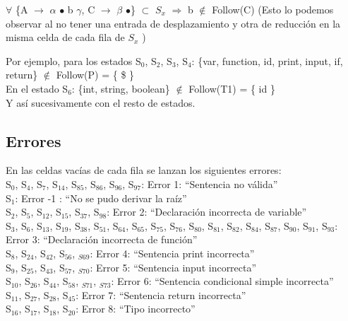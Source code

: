 	$\forall$ \{A $\rightarrow$ $\alpha$ $\bullet$ b $\gamma$, C $\rightarrow$ $\beta$ $\bullet$\} $\subset$ $S_x$ $\Rightarrow$ b $\notin$ Follow(C) (Esto lo podemos observar al no tener una entrada de desplazamiento y otra de reducción en la misma celda de cada fila de $S_x$ )

	Por ejemplo, para los estados S$_0$,  S$_2$,  S$_3$,  S$_4$: \{var, function, id, print, input, if, return\} $\notin$ Follow(P) = \{ \$ \} \\
	En el estado S$_6$:  \{int, string, boolean\} $\notin$ Follow(T1) = \{ id \}\\
	Y así sucesivamente con el resto de estados.
	
\subsection{Errores}
En las celdas vacías de cada fila se lanzan los siguientes errores:\\

S$_0$, S$_4$, S$_7$, S$_{14}$, S$_{85}$, S$_{86}$, S$_{96}$, S$_{97}$: Error 1: “Sentencia no válida” \\

S$_{1}$: Error -1 : “No se pudo derivar la raíz”\\

S$_{2}$, S$_{5}$, S$_{12}$, S$_{15}$, S$_{37}$, S$_{98}$: Error 2: “Declaración incorrecta de variable”\\

S$_{3}$, S$_{6}$, S$_{13}$, S$_{19}$, S$_{38}$, S$_{51}$, S$_{64}$, S$_{65}$, S$_{75}$, S$_{76}$, S$_{80}$, S$_{81}$, S$_{82}$, S$_{84}$, S$_{87}$, S$_{90}$, S$_{91}$, S$_{93}$:\\
\indent Error 3: “Declaración incorrecta de función”\\

S$_{8}$, S$_{24}$, S$_{42}$, S$_{56}$, $_{S69}$: Error 4: “Sentencia print incorrecta”\\

S$_{9}$, S$_{25}$, S$_{43}$, S$_{57}$, $_{S70}$: Error 5: “Sentencia input incorrecta”\\

S$_{10}$, S$_{26}$, S$_{44}$, S$_{58}$, $_{S71}$, $_{S73}$: Error 6: “Sentencia condicional simple incorrecta”\\

S$_{11}$, S$_{27}$, S$_{28}$, S$_{45}$: Error 7: “Sentencia return incorrecta”\\

S$_{16}$, S$_{17}$, S$_{18}$, S$_{20}$: Error 8: “Tipo incorrecto”\\

